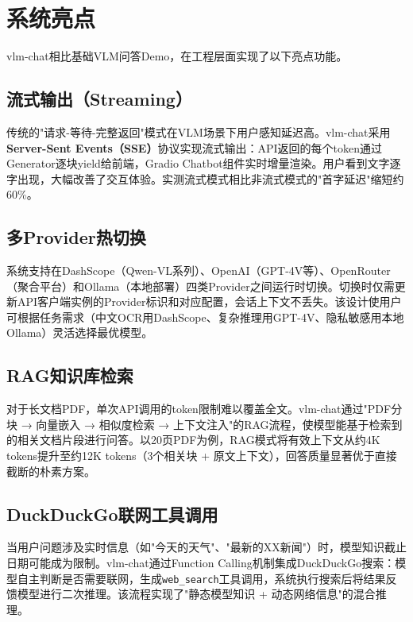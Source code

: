 \section{系统亮点}

vlm-chat相比基础VLM问答Demo，在工程层面实现了以下亮点功能。

\subsection{流式输出（Streaming）}

传统的"请求-等待-完整返回"模式在VLM场景下用户感知延迟高。vlm-chat采用\textbf{Server-Sent Events（SSE）}协议实现流式输出：API返回的每个token通过Generator逐块yield给前端，Gradio Chatbot组件实时增量渲染。用户看到文字逐字出现，大幅改善了交互体验。实测流式模式相比非流式模式的"首字延迟"缩短约60\%。

\subsection{多Provider热切换}

系统支持在DashScope（Qwen-VL系列）、OpenAI（GPT-4V等）、OpenRouter（聚合平台）和Ollama（本地部署）四类Provider之间运行时切换。切换时仅需更新API客户端实例的Provider标识和对应配置，会话上下文不丢失。该设计使用户可根据任务需求（中文OCR用DashScope、复杂推理用GPT-4V、隐私敏感用本地Ollama）灵活选择最优模型。

\subsection{RAG知识库检索}

对于长文档PDF，单次API调用的token限制难以覆盖全文。vlm-chat通过"PDF分块 → 向量嵌入 → 相似度检索 → 上下文注入"的RAG流程，使模型能基于检索到的相关文档片段进行问答。以20页PDF为例，RAG模式将有效上下文从约4K tokens提升至约12K tokens（3个相关块 + 原文上下文），回答质量显著优于直接截断的朴素方案。

\subsection{DuckDuckGo联网工具调用}

当用户问题涉及实时信息（如"今天的天气"、"最新的XX新闻"）时，模型知识截止日期可能成为限制。vlm-chat通过Function Calling机制集成DuckDuckGo搜索：模型自主判断是否需要联网，生成\texttt{web\_search}工具调用，系统执行搜索后将结果反馈模型进行二次推理。该流程实现了"静态模型知识 + 动态网络信息"的混合推理。

